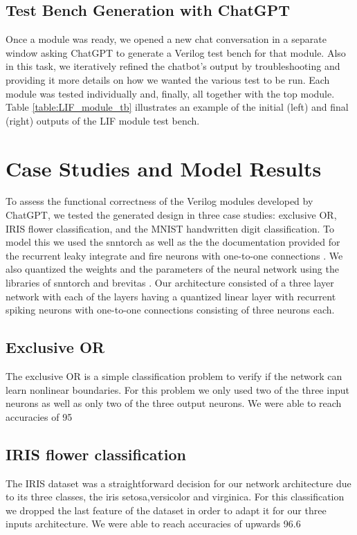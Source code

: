 \subsection{Test Bench Generation with ChatGPT}
Once a module was ready, we opened a new chat conversation in a separate window asking ChatGPT to generate a Verilog test bench for that module. 
Also in this task, we iteratively refined the chatbot's output by troubleshooting and providing it more details on how we wanted the various test to be run.
Each module was tested individually and, finally, all together with the top module.
Table \ref{table:LIF_module_tb} illustrates an example of the initial (left) and final (right) outputs of the LIF module test bench.






\section{Case Studies and Model Results}
To assess the functional correctness of the Verilog modules developed by ChatGPT, we tested the generated design in three case studies: exclusive OR, IRIS flower classification, and the MNIST handwritten digit classification. To model this we used the snntorch as well as the the documentation provided for the recurrent leaky integrate and fire neurons with one-to-one connections \cite{jason}. We also quantized the weights and the parameters of the neural network using the libraries of snntorch and brevitas \cite{brevitas}. Our architecture consisted of a three layer network with each of the layers having  a quantized linear layer with recurrent spiking neurons with one-to-one connections consisting of three neurons each. 

\subsection{Exclusive OR}
The exclusive OR is a simple classification problem to verify if the network can learn nonlinear boundaries. For this problem we only used two of the three input neurons as well as only two of the three output neurons. We were able to reach accuracies of 95\

\subsection{IRIS flower classification}
The IRIS dataset was a straightforward decision for our network architecture due to its three classes, the iris setosa,versicolor and virginica. For this classification we dropped the last feature of the dataset in order to adapt it for our three inputs architecture. We were able to reach accuracies of upwards 96.6\






